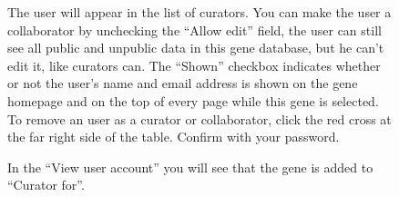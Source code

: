 \begin{figure}[ht]
  \begin{shaded}
  	\caption{The user will appear in the list of curators.
  	You can make the user a collaborator by unchecking the ``Allow edit'' field, 
  	 the user can still see all public and unpublic data in this gene database, but he can't edit it, 
  	 like curators can.\newline 
		The ``Shown'' checkbox indicates whether or not the user's name and email address is shown
		 on the gene homepage and on the top of every page while this gene is selected.\newline
		To remove an user as a curator or collaborator, click the red cross at the far right side of the table.
  	Confirm with your password.}
	  \label{fig:make_user_curator_III}
  \end{shaded}
\end{figure}

\begin{figure}[ht]
  \begin{shaded}
  	\caption{In the ``View user account'' you will see that the gene is added to ``Curator for''.}
	  \label{fig:make_user_curator_IV}
  \end{shaded}
\end{figure}

